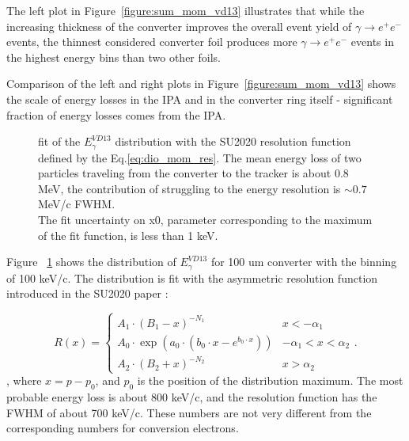 The left plot in Figure~\ref{figure:sum_mom_vd13} illustrates that while the increasing
thickness of the converter improves the overall event yield of $\gamma \to e^+e^-$ events,
the thinnest considered converter foil produces more $\gamma \to e^+e^-$ events in the highest
energy bins than two other foils.

Comparison of the left and right plots in Figure~\ref{figure:sum_mom_vd13} shows the scale of energy
losses in the IPA and in the converter ring itself - significant fraction of energy losses comes
from the IPA.

\begin{figure}[H]
  \caption{
    \label{figure:00083}
    fit of the $E_\gamma^{VD13}$ distribution with the SU2020 resolution function defined by
    the Eq.\ref{eq:dio_mom_res}.
    The mean energy loss of two particles traveling from the converter to the tracker is about 0.8 MeV,
    the contribution of struggling to the energy resolution is $\sim 0.7$ MeV/c FWHM. \\
    The fit uncertainty on x0, parameter corresponding to the maximum of the fit function,
    is less than 1 keV.
  }
\end{figure}

Figure ~\ref{figure:00083} shows the distribution of $E_\gamma^{VD13}$
for 100 um converter with the binning of 100 keV/c. The distribution is fit
with the asymmetric resolution function introduced in the SU2020 paper \cite{MU2E_SU2020_PAPER}:

\begin{equation}
  \label{eq:dio_mom_res}
  R(x) =
 \begin{cases}
    A_1 \cdot (B_1-x)^{-N_1}                                 & x < -\alpha_1 \\
    A_0 \cdot \exp (a_0 \cdot (b_0 \cdot x - e^{b_0 \cdot x})) & -\alpha_1< x < \alpha_2 \\
    A_2 \cdot (B_2+x)^{-N_2}                                 &  x > \alpha_2
  \end{cases}.
\end{equation}
, where $x = p-p_0$, and $p_0$ is the position of the distribution maximum.
The most probable energy loss is about 800 keV/c, 
and the resolution function has the FWHM of about 700 keV/c.
These numbers are not very different from the corresponding numbers for conversion electrons.


